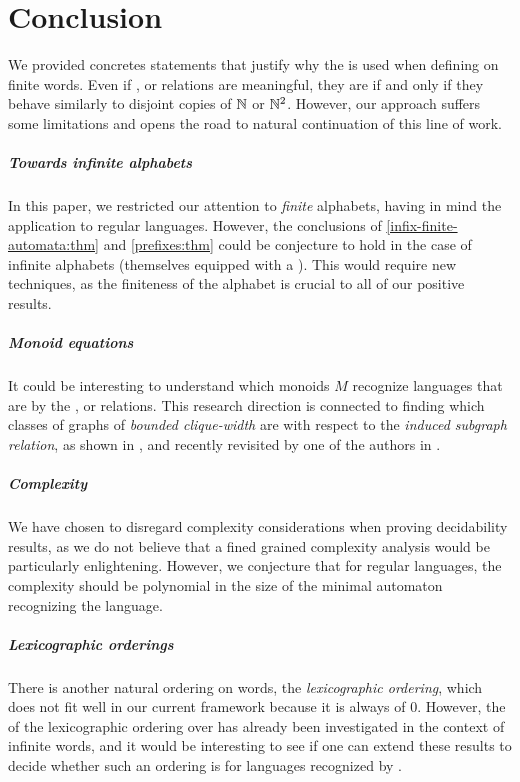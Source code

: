 \section{Conclusion}
\label{conclusion:sec}

We provided concretes statements that justify why the 
is used when defining  on finite words. Even if
,  or  relations are meaningful, they are
 if and only if they behave similarly to disjoint copies
of $\mathbb{N}$ or $\mathbb{N}^2$. However, our approach suffers some limitations 
and opens the road to natural continuation of this line of work.

\subparagraph{Towards infinite alphabets} In this paper, we restricted our
attention to \emph{finite} alphabets, having in mind the application to regular
languages. However, the conclusions of \cref{infix-finite-automata:thm} and
\cref{prefixes:thm} could be conjecture to hold in the case of infinite
alphabets (themselves equipped with a ). This would
require new techniques, as the finiteness of the alphabet is crucial to all of
our positive results.

\subparagraph{Monoid equations}  It could be interesting to understand which
monoids $M$ recognize languages that are  by the
,  or  relations. This research direction is
connected to finding which classes of graphs of \emph{bounded clique-width} are
 with respect to the \emph{induced subgraph relation},
as shown in \cite{DRT10}, and recently revisited by one of the authors in
\cite{L24:arxiv:v2}.

\subparagraph{Complexity} We have chosen to disregard complexity considerations
when proving decidability results, as we do not believe that a fined grained
complexity analysis would be particularly enlightening. However, we conjecture
that for regular languages, the complexity should be polynomial in the size of
the minimal automaton recognizing the language.


\subparagraph{Lexicographic orderings} There is another natural ordering on
words, the \emph{lexicographic ordering}, which does not fit well in our
current framework because it is always of  $0$. However, the
 of the lexicographic ordering over  has
already been investigated in the context of infinite words, and it would be
interesting to see if one can extend these results to decide whether such an
ordering is  for languages recognized by .
